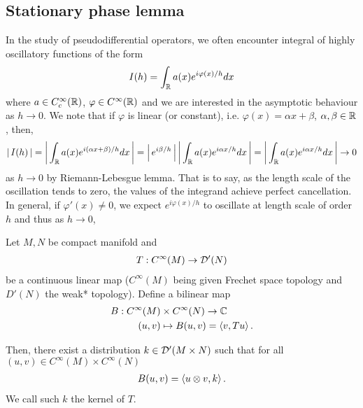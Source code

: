 \documentclass{article}
\begin{document}
\subsection{Stationary phase lemma} 
In the study of pseudodifferential operators, we often encounter integral of highly oscillatory functions of the form
    \begin{align*}
    I(h) = \int_\R a(x) e^{i \varphi(x) /h} dx
    \end{align*}
where $a \in C^\infty_c(\R)$, $\varphi \in C^\infty(\R)$ and we are interested in the asymptotic behaviour as $h \to 0$. We note that if $\varphi$ is linear (or constant), i.e. $\varphi(x) = \alpha x+ \beta$, $\alpha, \beta \in \R$, then, 
\begin{align*}
   \abs{I(h)} = \abs{\int_\R a(x) e^{i (\alpha x + \beta) /h} dx} = \abs{e^{i \beta/h}} \abs{\int_\R a(x) e^{i \alpha x /h} dx} =  \abs{\int_\R a(x) e^{i \alpha x /h} dx} \to 0
\end{align*}
as $h \to 0$ by Riemann-Lebesgue lemma. That is to say, as the length scale of the oscillation tends to zero, the values of the integrand achieve perfect cancellation. In general, if $\varphi'(x) \neq 0$, we expect $e^{i\varphi(x)/h}$ to oscillate at length scale of order $h$ and thus as $h \to 0$, 





\begin{ftheorem} Let $M, N$ be compact manifold and 
    \begin{align*}
    T: C^\infty(M) \to \D'(N) \\
    \end{align*}
    be a continuous linear map ($C^\infty(M)$ being given Frechet space topology and $D'(N)$ the weak* topology). Define a bilinear map 
    \begin{align*}
    B: C^\infty(M) &\times C^\infty(N) \to \C \\
    (u, v) &\mapsto B(u, v) = \inprod[v, Tu]. 
    \end{align*}
    
    Then, there exist a distribution $k \in \D'(M \times N)$ such that for all $(u, v) \in C^\infty(M) \times C^\infty(N)$
    \begin{align*}
    B(u, v) = \inprod[u \otimes v, k]. 
    \end{align*}
    We call such $k$ the kernel of $T$. 
\end{ftheorem}




\end{document}
